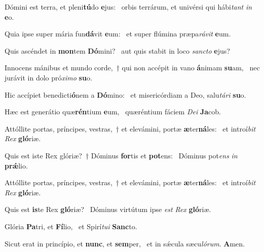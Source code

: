 \item Dómini est terra, et pleni\textbf{tú}do \textbf{e}jus:~\psstar{} orbis terrárum, et univérsi qui hábi\textit{tant} \textit{in} \textbf{e}o.
\item Quia ipse super mária fun\textbf{dá}vit \textbf{e}um:~\psstar{} et super flúmina præpa\textit{rávit} \textbf{e}um.
\item Quis ascéndet in \textbf{mon}tem \textbf{Dó}mini?~\psstar{} aut quis stabit in loco \textit{sancto} \textbf{e}jus?
\item Innocens mánibus et mundo corde,~† qui non accépit in vano \textbf{á}nimam \textbf{su}am,~\psstar{} nec jurávit in dolo pró\textit{ximo} \textbf{su}o.
\item Hic accípiet benedicti\textbf{ó}nem a \textbf{Dó}mino:~\psstar{} et misericórdiam a Deo, salu\textit{tári} \textbf{su}o.
\item Hæc est generátio quæ\textbf{rén}tium \textbf{e}um,~\psstar{} quæréntium fáciem \textit{Dei} \textbf{Ja}cob.
\item Attóllite portas, príncipes, vestras,~† et elevámini, portæ \textbf{æ}ter\textbf{ná}les:~\psstar{} et introí\textit{bit} \textit{Rex} \textbf{gló}riæ.
\item Quis est iste Rex glóriæ?~† Dóminus \textbf{for}tis et \textbf{pot}ens:~\psstar{} Dóminus pot\textit{ens} \textit{in} \textbf{prǽ}lio.
\item Attóllite portas, príncipes, vestras,~† et elevámini, portæ \textbf{æ}ter\textbf{ná}les:~\psstar{} et introí\textit{bit} \textit{Rex} \textbf{gló}riæ.
\item Quis est \textbf{is}te Rex \textbf{gló}riæ?~\psstar{} Dóminus virtútum ipse \textit{est} \textit{Rex} \textbf{gló}riæ.
\item Glória \textbf{Pa}tri, et \textbf{Fí}lio,~\psstar{} et Spirí\textit{tui} \textbf{Sanc}to.
\item Sicut erat in princípio, et \textbf{nunc}, et \textbf{sem}per,~\psstar{} et in sǽcula sæcu\textit{lórum}. \textbf{A}men.